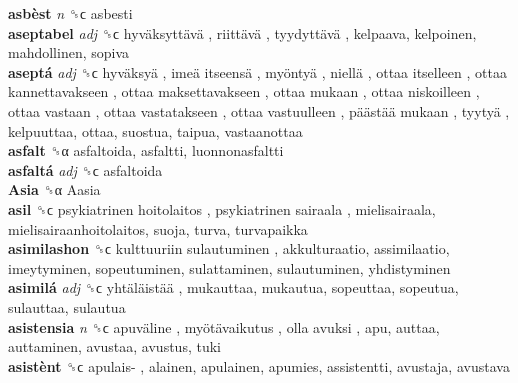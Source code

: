 \textbf{asbèst} \emph{n}  ␝ϲ  asbesti  \\
\textbf{aseptabel} \emph{adj}  ␝ϲ   hyväksyttävä ,  riittävä ,  tyydyttävä , kelpaava, kelpoinen, mahdollinen, sopiva  \\
\textbf{aseptá} \emph{adj}  ␝ϲ   hyväksyä ,  imeä itseensä ,  myöntyä ,  niellä ,  ottaa itselleen ,  ottaa kannettavakseen ,  ottaa maksettavakseen ,  ottaa mukaan ,  ottaa niskoilleen ,  ottaa vastaan ,  ottaa vastatakseen ,  ottaa vastuulleen ,  päästää mukaan ,  tyytyä , kelpuuttaa, ottaa, suostua, taipua, vastaanottaa  \\
\textbf{asfalt} ␝α  asfaltoida, asfaltti, luonnonasfaltti  \\
\textbf{asfaltá} \emph{adj}  ␝ϲ  asfaltoida  \\
\textbf{Asia} ␝α   Aasia   \\
\textbf{asil} ␝ϲ   psykiatrinen hoitolaitos ,  psykiatrinen sairaala , mielisairaala, mielisairaanhoitolaitos, suoja, turva, turvapaikka  \\
\textbf{asimilashon} ␝ϲ   kulttuuriin sulautuminen , akkulturaatio, assimilaatio, imeytyminen, sopeutuminen, sulattaminen, sulautuminen, yhdistyminen  \\
\textbf{asimilá} \emph{adj}  ␝ϲ   yhtäläistää , mukauttaa, mukautua, sopeuttaa, sopeutua, sulauttaa, sulautua  \\
\textbf{asistensia} \emph{n}  ␝ϲ   apuväline ,  myötävaikutus ,  olla avuksi , apu, auttaa, auttaminen, avustaa, avustus, tuki  \\
\textbf{asistènt} ␝ϲ   apulais- , alainen, apulainen, apumies, assistentti, avustaja, avustava  \\
